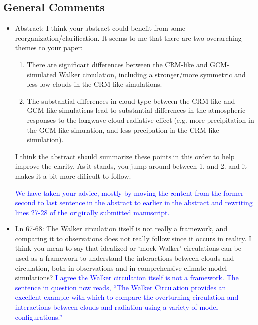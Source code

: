 \documentclass[draft]{agujournal2019}
\begin{document}

\subsection{General Comments}

\begin{itemize}
\item Abstract: 
I think your abstract could benefit from some  reorganization/clarification. It seems to me that there are two overarching themes to your paper:
    \begin{enumerate}
  \item There are significant differences between the CRM-like and GCM-simulated Walker circulation, including a stronger/more symmetric and less low clouds in the CRM-like simulations.
  \item The substantial differences in cloud type between the CRM-like and GCM-like simulations lead to substantial differences in the  atmospheric responses to the longwave cloud radiative effect (e.g. more precipitation in the GCM-like simulation, and less precipation in the CRM-like simulation). 
    \end{enumerate}
    I think the abstract should summarize these points in this order to help improve the clarity.
   As it stands, you jump around between 1. and 2. and it makes it a bit more difficult to follow. 
   
   \textcolor{blue}{We have taken your advice, mostly by moving the content from the former second to last sentence in the abstract to earlier in the abstract and rewriting lines 27-28 of 
   the originally submitted manuscript.}
    
\item Ln 67-68:  The Walker circulation itself is not really a framework, and comparing it to observations does not really follow since it occurs in reality. I think you mean to say that idealized or ‘mock-Walker’ circulations can be used as a framework to understand the interactions between clouds and circulation, both in observations and in comprehensive climate model simulations? 
  \textcolor{blue}{I agree the Walker circulation itself is not a framework.  The sentence in question now reads, ``The Walker Circulation provides an excellent example with which to compare the overturning circulation and interactions between clouds and radiation using a variety of model configurations.''}


\end{itemize}
\end{document}
